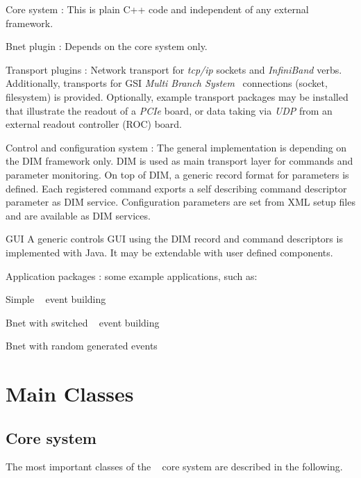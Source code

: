 \begin{compactdesc}
\item [Core system] : This is plain C++ code and independent of any external framework.
\item [Bnet plugin] : Depends on the core system only.
\item [Transport plugins] :  Network transport for  \textit{tcp/ip} sockets and \textit{InfiniBand} verbs. Additionally, 
transports for GSI \textit{Multi Branch System} \mbs\ connections (socket, filesystem) is provided. Optionally, example transport packages may be installed that
illustrate the readout of a \textit{PCIe} board, or data taking via \textit{UDP} from
an external readout controller (ROC) board.
\item [Control and configuration system]: The general implementation is depending on the DIM framework only.
DIM is used as main transport layer for commands and parameter monitoring.  On top of DIM, a generic record format for parameters is defined. Each registered command exports a self describing command descriptor  parameter as DIM service. Configuration parameters are set from XML setup files and are 
available as DIM services.      
\item  [GUI] A generic controls GUI using the DIM record and command descriptors is 
      implemented with Java. It may be extendable with user defined components.
\item[Application packages] : some example applications, such as: 
\begin{compactitem}[$\circ$]
\item  Simple \mbs~ event building
\item  Bnet with switched \mbs~ event building
\item  Bnet with random generated events
\end{compactitem}

      
\end{compactdesc}   






\section{Main Classes}
\subsection{Core system}
\label{prog_core_classes}
The most important classes of the \dabc~ core system are described in the following.

